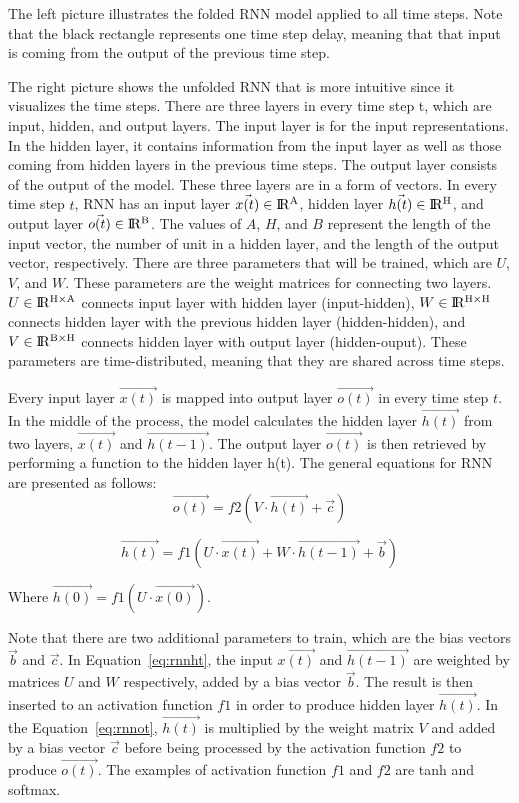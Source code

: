 The left picture illustrates the folded RNN model applied to all time steps. Note that the black rectangle represents one time step delay, meaning that that input is coming from the output of the previous time step. 

The right picture shows the unfolded RNN that is more intuitive since it visualizes the time steps. There are three layers in every time step t, which are input, hidden, and output layers. The input layer is for the input representations. In the hidden layer, it contains information from the input layer as well as those coming from hidden layers in the previous time steps. The output layer consists of the output of the model. These three layers are in a form of vectors. In every time step $t$, RNN has an input layer $ \vec{x(t)} \in {\rm I\!R^{A}} $, hidden layer $ \vec{h(t)} \in {\rm I\!R^{H}} $, and output layer $ \vec{o(t)} \in {\rm I\!R^{B}} $. The values of $A$, $H$, and $B$ represent the length of the input vector, the number of unit in a hidden layer, and the length of the output vector, respectively. There are three parameters that will be trained, which are $U$, $V$, and $W.$ These parameters are the weight matrices for connecting two layers. $ U \in {\rm I\!R^{H \times A }}$ connects input layer with hidden layer (input-hidden), $ W \in {\rm I\!R^{H \times H}}$ connects hidden layer with the previous hidden layer (hidden-hidden), and $ V \in {\rm I\!R^{B \times H}}$ connects hidden layer with output layer (hidden-ouput). These parameters are time-distributed, meaning that they are shared across time steps. 

Every input layer $ \vec{x(t)} $ is mapped into output layer $ \vec{o(t)} $ in every time step $t$. In the middle of the process, the model calculates the hidden layer $ \vec{h(t)} $ from two layers, $ \vec{x(t)} $ and $ \vec{h(t-1)} $. The output layer $ \vec{o(t)} $ is then retrieved by performing a function to the hidden layer h(t). The general equations for RNN are presented as follows:
\begin{equation}
\label{eq:rnnot}
\vec{o(t)} = f2(V \cdot \vec{h(t)} + \vec{c})
\end{equation}

\begin{equation}
\label{eq:rnnht}
\vec{h(t)} = f1(U \cdot \vec{x(t)} + W \cdot \vec{h(t-1)} + \vec{b})
\end{equation}

Where $ \vec{h(0)} = f1(U \cdot \vec{x(0)}) $.

Note that there are two additional parameters to train, which are the bias vectors $\vec{b}$ and $\vec{c}$. In Equation~\ref{eq:rnnht}, the input $\vec{x(t)}$ and $\vec{h(t-1)}$ are weighted by matrices $U$ and $W$ respectively, added by a bias vector $\vec{b}$. The result is then inserted to an activation function $f1$ in order to produce hidden layer $\vec{h(t)}$. In the Equation~\ref{eq:rnnot}, $\vec{h(t)}$ is multiplied by the weight matrix $V$ and added by a bias vector $\vec{c}$ before being processed by the activation function $f2$ to produce $\vec{o(t)}$. The examples of activation function $f1$ and $f2$ are tanh and softmax.

